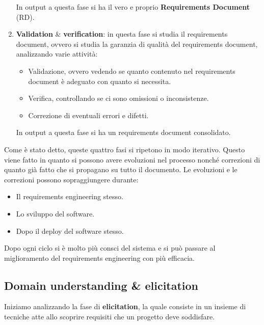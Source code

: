 \begin{enumerate}
\begin{itemize}
            \end{itemize}
            In output a questa fase si ha il vero e proprio \textbf{Requirements
                  Document} (RD).
      \item \textbf{Validation} $\&$ \textbf{verification}: in questa fase si
            studia il requirements document, ovvero si studia la garanzia di
            qualità del requirements document, analizzando varie attività:
            \begin{itemize}
                  \item Validazione, ovvero vedendo se quanto contenuto nel
                        requirements document è adeguato con quanto si necessita.
                  \item Verifica, controllando se ci sono omissioni o
                        inconsistenze.
                  \item Correzione di eventuali errori e difetti.
            \end{itemize}
            In output a questa fase si ha un requirements document consolidato.
\end{enumerate}
Come è stato detto, queste quattro fasi si ripetono in modo iterativo. Questo
viene fatto in quanto si possono avere evoluzioni nel processo nonché correzioni
di quanto già fatto che si propagano su tutto il documento. Le evoluzioni e le
correzioni possono sopraggiungere durante:
\begin{itemize}
      \item Il requirements engineering stesso.
      \item Lo sviluppo del software.
      \item Dopo il deploy del software stesso.
\end{itemize}
Dopo ogni ciclo si è molto più consci del sistema e si può passare al miglioramento
del requirements engineering con più efficacia.
\subsection{Domain understanding \& elicitation}
Iniziamo analizzando la fase di \textbf{elicitation}, la quale consiste in un
insieme di tecniche atte allo scoprire requisiti che un progetto deve soddisfare.
